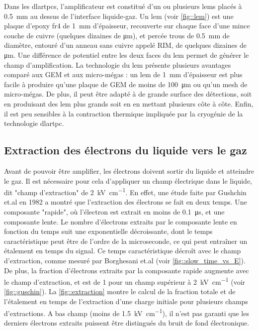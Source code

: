       Dans les \glspl{dlartpc}, l'amplificateur est constitué d'un ou plusieurs \glspl{lem} placés à \SI{0.5}{\milli\meter} au dessus de l'interface liquide-gaz. Un \gls{lem} (voir \autoref{fig::lem}) est une plaque d'epoxy \gls{fr4} de \SI{1}{\milli\meter} d'épaisseur, recouverte sur chaque face d'une mince couche de cuivre (quelques dizaines de \si{\micro\meter}), et percée trous de \SI{0.5}{\milli\meter} de diamètre, entouré d'un anneau sans cuivre appelé RIM, de quelques dizaines de \si{\micro\meter}. Une différence de potentiel entre les deux faces du \gls{lem} permet de générer le champ d'amplification. La technologie du \gls{lem} présente plusieurs avantages comparé aux GEM et aux micro-mégas : un \gls{lem} de \SI{1}{\milli\meter} d'épaisseur est plus facile à produire qu'une plaque de GEM de moins de \SI{100}{\micro\meter} ou qu'un mesh de micro-mégas. De plus, il peut être adapté à de grande surface des détections, soit en produisant des \gls{lem} plus grands soit en en mettant plusieurs côte à côte. Enfin, il est peu sensibles à la contraction thermique impliquée par la cryogénie de la technologie \gls{dlartpc}.

    \subsection{Extraction des électrons du liquide vers le gaz}

      Avant de pouvoir être amplifier, les électrons doivent sortir du liquide et atteindre le gaz. Il est nécessaire pour cela d'appliquer un champ électrique dans le liquide, dit "champ d'extraction" de \SI{2}{\kilo\volt\per\centi\meter}. En effet, une étude faite par Gushchin et.al en 1982\cite{guschin} a montré que l'extraction des électrons se fait en deux temps. Une composante "rapide", où l'électron est extrait en moins de \SI{0.1}{\micro\second}, et une composante lente. Le nombre d'électrons extraits par le composante lente en fonction du temps suit une exponentielle décroissante, dont le temps caractéristique peut être de l'ordre de la microseconde\cite{Borghesani1990}, ce qui peut entraîner un étalement en temps du signal. Ce temps caractéristique décroît avec le champ d'extraction, comme mesuré par Borghesani et.al\cite{Borghesani1990} (voir \autoref{fig::slow_time_vs_E}). De plus, la fraction d'électrons extraits par la composante rapide augmente avec le champ d'extraction, et est de 1 pour un champ supérieur à \SI{2}{\kilo\volt\per\centi\meter}\cite{guschin} (voir \autoref{fig::guschin}). La \autoref{fig::extraction} montre le calcul de la fraction totale et de l'étalement en temps de l'extraction d'une charge initiale pour plusieurs champs d'extractions. A bas champ (moins de \SI{1.5}{\kilo\volt\per\centi\meter}), il n'est pas garanti que les derniers électrons extraits puissent être distingués du bruit de fond électronique.

